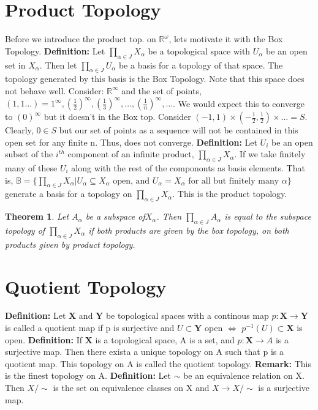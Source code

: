 \documentclass[a4paper, 12pt]{article}
\newcommand{\RR}{\mathbb{R}}
\newcommand{\XX}{\mathbf{X}}
\newcommand{\YY}{\mathbf{Y}}
\newtheorem{theorm}{Theorem}
\begin{document}
\section{Product Topology}   
Before we introduce the product top. on $\RR^{\omega}$, lets motivate it with the Box Topology. 
\newline
\textbf{Definition:} Let $\prod\limits_{\alpha \in J} X_{\alpha}$ be a topological space with $U_{\alpha}$ be an open set in $X_{\alpha}$. Then let $\prod\limits_{\alpha \in J} U_{\alpha}$ be a basis for a topology of that space. The topology generated by this basis is the Box Topology.
\newline
Note that this space does not behave well. Consider: $\RR^{\infty}$ and the set of points, $(1, 1 \dots) = 1^{\infty}, (\frac{1}{2})^{\infty},(\frac{1}{3})^{\infty}, \dots, (\frac{1}{n})^{\infty}, \dots$. We would expect this to converge to $(0)^{\infty}$ but it doesn't in the Box top. Consider $(-1, 1) \times (-\frac{1}{2}, \frac{1}{2}) \times \dots = S$. Clearly, $0 \in S$ but our set of points as a sequence will not be contained in this open set for any finite n. Thus, does not converge. \newline
\textbf{Definition:} Let $U_i$ be an open subset of the $i^{th}$ component of an infinite product, $\prod\limits_{\alpha \in J} X_{\alpha}$. If we take finitely many of these $U_i$ along with the rest of the compononts as basis elements. That is, $\mathbb{B} = \{\prod\limits_{\alpha \in J} X_{\alpha} | U_{\alpha} \subseteq X_{\alpha} \text{ open, and } U_{\alpha} = X_{\alpha} \text{ for all but finitely many } \alpha \}$ generate a basis for a topology on $\prod\limits_{\alpha \in J} X_{\alpha}$. This is the product topology.
\begin{theorm}
        Let $A_{\alpha}$ be a subspace of$ X_{\alpha}$. Then $\prod\limits_{\alpha \in J} A_{\alpha}$ is equal to the subspace topology of $\prod\limits_{\alpha \in J} X_{\alpha}$ if both products are given by the box topology, on both products given by product topology.
\end{theorm}

\section{Quotient Topology}
\textbf{Definition:} Let $\XX$ and $\YY$ be topological spaces with a continous map $p: \XX \rightarrow \YY$ is called a quotient map if p is surjective and $U \subset \YY$ open $\Leftrightarrow$ $p^{-1}(U) \subset \XX$ is open.\newline
\textbf{Definition:} If $\XX$ is a topological space, A is a set, and $p: \XX \rightarrow A$ is a surjective map. Then there exista a unique topology on A such that p is a quotient map. This topology on A is called the quotient topology. \textbf{Remark:} This is the finest topology on A.\newline
\textbf{Definition:} Let $\sim$ be an equivalence relation on X. Then $X /\sim$ is the set on equivalence classes on X and $X \rightarrow X /\sim$ is a surjective map.\newline
\end{document}
